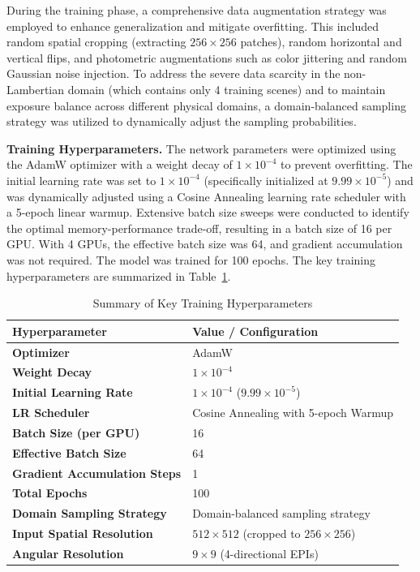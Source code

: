 \documentclass[lettersize,journal]{IEEEtran}
\begin{document}
During the training phase, a comprehensive data augmentation strategy was employed to enhance generalization and mitigate overfitting. This included random spatial cropping (extracting $256 \times 256$ patches), random horizontal and vertical flips, and photometric augmentations such as color jittering and random Gaussian noise injection. To address the severe data scarcity in the non-Lambertian domain (which contains only 4 training scenes) and to maintain exposure balance across different physical domains, a domain-balanced sampling strategy was utilized to dynamically adjust the sampling probabilities.

\textbf{Training Hyperparameters.} 
The network parameters were optimized using the AdamW optimizer \cite{7} with a weight decay of $1 \times 10^{-4}$ to prevent overfitting. The initial learning rate was set to $1 \times 10^{-4}$ (specifically initialized at $9.99 \times 10^{-5}$) and was dynamically adjusted using a Cosine Annealing learning rate scheduler with a 5-epoch linear warmup. Extensive batch size sweeps were conducted to identify the optimal memory-performance trade-off, resulting in a batch size of 16 per GPU. With 4 GPUs, the effective batch size was 64, and gradient accumulation was not required. The model was trained for 100 epochs. The key training hyperparameters are summarized in Table~\ref{tab:hyperparameters}.

\begin{table}[!t]
\caption{Summary of Key Training Hyperparameters}
\label{tab:hyperparameters}
\centering
\begin{tabular}{ll}
\toprule
Hyperparameter & Value / Configuration \\
\midrule
\textbf{Optimizer} & AdamW \\
\textbf{Weight Decay} & $1 \times 10^{-4}$ \\
\textbf{Initial Learning Rate} & $1 \times 10^{-4}$ ($9.99 \times 10^{-5}$) \\
\textbf{LR Scheduler} & Cosine Annealing with 5-epoch Warmup \\
\textbf{Batch Size (per GPU)} & 16 \\
\textbf{Effective Batch Size} & 64 \\
\textbf{Gradient Accumulation Steps} & 1 \\
\textbf{Total Epochs} & 100 \\
\textbf{Domain Sampling Strategy} & Domain-balanced sampling strategy \\
\textbf{Input Spatial Resolution} & $512 \times 512$ (cropped to $256 \times 256$) \\
\textbf{Angular Resolution} & $9 \times 9$ (4-directional EPIs) \\
\bottomrule
\end{tabular}
\end{table}
\end{document}
